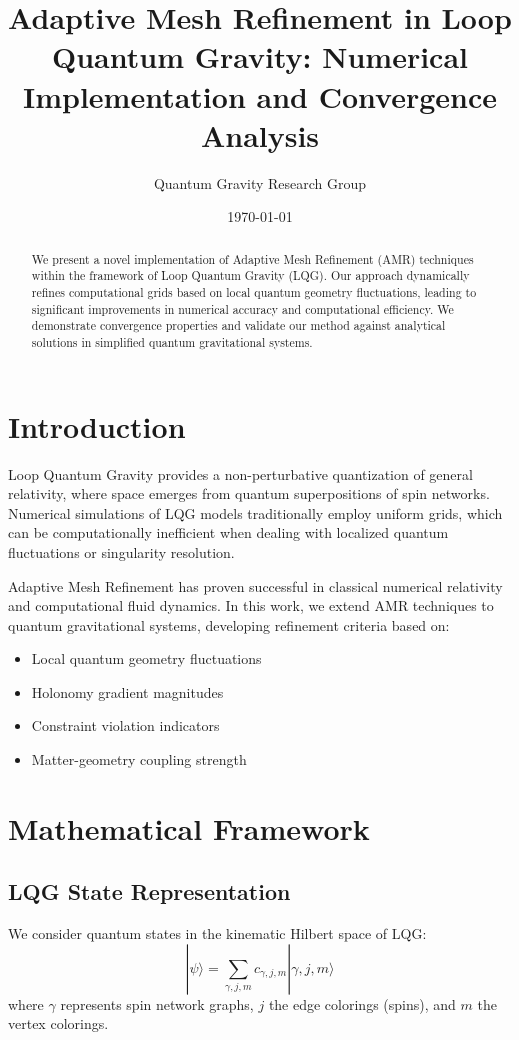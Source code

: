 \documentclass[11pt]{article}
\title{Adaptive Mesh Refinement in Loop Quantum Gravity: Numerical Implementation and Convergence Analysis}
\author{Quantum Gravity Research Group}
\date{\today}
\begin{document}
\maketitle

\begin{abstract}
We present a novel implementation of Adaptive Mesh Refinement (AMR) techniques within the framework of Loop Quantum Gravity (LQG). Our approach dynamically refines computational grids based on local quantum geometry fluctuations, leading to significant improvements in numerical accuracy and computational efficiency. We demonstrate convergence properties and validate our method against analytical solutions in simplified quantum gravitational systems.
\end{abstract}

\section{Introduction}

Loop Quantum Gravity provides a non-perturbative quantization of general relativity, where space emerges from quantum superpositions of spin networks. Numerical simulations of LQG models traditionally employ uniform grids, which can be computationally inefficient when dealing with localized quantum fluctuations or singularity resolution.

Adaptive Mesh Refinement has proven successful in classical numerical relativity and computational fluid dynamics. In this work, we extend AMR techniques to quantum gravitational systems, developing refinement criteria based on:
\begin{itemize}
\item Local quantum geometry fluctuations
\item Holonomy gradient magnitudes
\item Constraint violation indicators
\item Matter-geometry coupling strength
\end{itemize}

\section{Mathematical Framework}

\subsection{LQG State Representation}

We consider quantum states in the kinematic Hilbert space of LQG:
\begin{equation}
|\psi\rangle = \sum_{\gamma,j,m} c_{\gamma,j,m} |\gamma,j,m\rangle
\end{equation}
where $\gamma$ represents spin network graphs, $j$ the edge colorings (spins), and $m$ the vertex colorings.
\end{document}
